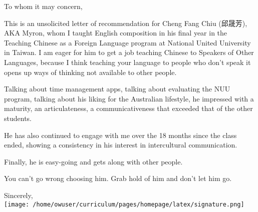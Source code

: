 \documentclass[11pt, a4paper]{letter} %
\begin{document}

\begin{letter}{
}


\opening{To whom it may concern,}

This is an unsolicited letter of recommendation for Cheng Fang 
Chiu (邱晟芳), AKA Myron, whom I taught English 
composition in his final year in the Teaching Chinese as 
a Foreign Language program at National United University 
in Taiwan. I am eager for him to get a job teaching 
Chinese to Speakers of Other Languages, because I think 
teaching your language to people who don't speak it opens 
up ways of thinking not available to other people.

Talking about time management apps, talking about evaluating the
NUU program, talking about his liking for the Australian lifestyle,
he impressed with a maturity, an articulateness, a communicativeness
that exceeded that of the other students.

He has also continued to engage with me over the 18 months since the class 
ended, showing a consistency in his interest in intercultural communication.

Finally, he is easy-going and gets along with other people.

You can't go wrong choosing him. Grab hold of him and don't let
him go.

\closing{Sincerely,\\
\texttt{[image: /home/owuser/curriculum/pages/homepage/latex/signature.png]} }



\end{letter}
\end{document}
